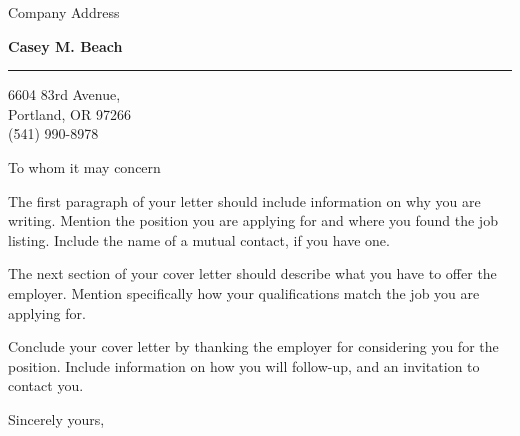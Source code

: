 \documentclass{letter} %
\begin{document}
\signature{Casey M. Beach}           %
\longindentation=0pt                       %
\let\raggedleft\raggedright                %
 
 
\begin{letter}{
    Company Address
}

\begin{center}
{\large\bf Casey M. Beach}
\end{center}
\medskip\hrule height 1pt
\begin{center}
6604 83rd Avenue,\\
Portland, OR 97266 \\
(541) 990-8978 
\end{center} 
\vfill %

 
\opening{To whom it may concern} 
\begin{flushleft} 

\noindent The first paragraph of your letter should include information on why 
you are writing. Mention the position you are applying for and where you found 
the job listing. Include the name of a mutual contact, if you have one.

\noindent The next section of your cover letter should describe what you have 
to offer the employer. Mention specifically how your qualifications match the 
job you are applying for.

\noindent Conclude your cover letter by thanking the employer for considering 
you for the position. Include information on how you will follow-up, and an
invitation to contact you.

\end{flushleft}
\closing{Sincerely yours,} 
\end{letter}
\end{document}
